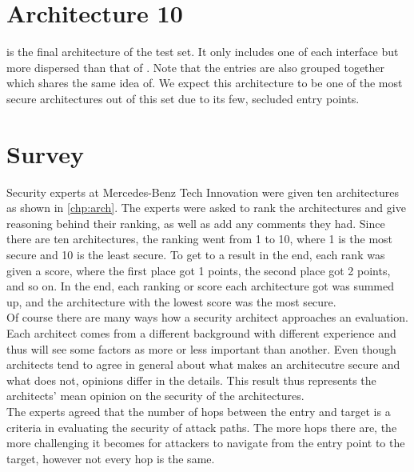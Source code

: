 \section{Architecture 10}
\label{subsec:arch10}

 is the final architecture of the test set. 
It only includes one of each interface but more dispersed than that of . 
Note that the entries are also grouped together which shares the same idea of. 
We expect this architecture to be one of the most secure architectures out of this set due to its few, secluded entry points.

\section{Survey}
\label{sec:survey}

Security experts at Mercedes-Benz Tech Innovation were given ten architectures as shown in \ref{chp:arch}.
The experts were asked to rank the architectures and give reasoning behind their ranking, as well as add any comments they had.
Since there are ten architectures, the ranking went from 1 to 10, where 1 is the most secure and 10 is the least secure.
To get to a result in the end, each rank was given a score, where the first place got 1 points, the second place got 2 points, and so on.
In the end, each ranking or score each architecture got was summed up, and the architecture with the lowest score was the most secure.\\

Of course there are many ways how a security architect approaches an evaluation.
Each architect comes from a different background with different experience and thus will see some factors as more or less important than another.
Even though architects tend to agree in general about what makes an architecutre secure and what does not, opinions differ in the details.
This result thus represents the architects' mean opinion on the security of the architectures.\\

The experts agreed that the number of hops between the entry and target is a criteria in evaluating the security of attack paths. 
The more hops there are, the more challenging it becomes for attackers to navigate from the entry point to the target, however not every hop is the same.\\

